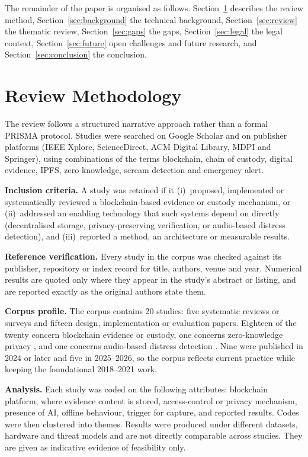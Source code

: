 \documentclass[conference,a4paper,10pt]{IEEEtran}
\begin{document}
The remainder of the paper is organised as follows. Section~\ref{sec:method} describes the review method, Section~\ref{sec:background} the technical background, Section~\ref{sec:review} the thematic review, Section~\ref{sec:gaps} the gaps, Section~\ref{sec:legal} the legal context, Section~\ref{sec:future} open challenges and future research, and Section~\ref{sec:conclusion} the conclusion.

\section{Review Methodology}\label{sec:method}
The review follows a structured narrative approach rather than a formal PRISMA protocol. Studies were searched on Google Scholar and on publisher platforms (IEEE Xplore, ScienceDirect, ACM Digital Library, MDPI and Springer), using combinations of the terms blockchain, chain of custody, digital evidence, IPFS, zero-knowledge, scream detection and emergency alert.

\textbf{Inclusion criteria.} A study was retained if it (i)~proposed, implemented or systematically reviewed a blockchain-based evidence or custody mechanism, or (ii)~addressed an enabling technology that such systems depend on directly (decentralised storage, privacy-preserving verification, or audio-based distress detection), and (iii)~reported a method, an architecture or measurable results.

\textbf{Reference verification.} Every study in the corpus was checked against its publisher, repository or index record for title, authors, venue and year. Numerical results are quoted only where they appear in the study's abstract or listing, and are reported exactly as the original authors state them.

\textbf{Corpus profile.} The corpus contains 20 studies: five systematic reviews or surveys \cite{akinbi,batista,onyeashie,lavin,bhad} and fifteen design, implementation or evaluation papers. Eighteen of the twenty concern blockchain evidence or custody, one concerns zero-knowledge privacy \cite{lavin}, and one concerns audio-based distress detection \cite{bhad}. Nine were published in 2024 or later and five in 2025--2026, so the corpus reflects current practice while keeping the foundational 2018--2021 work.

\textbf{Analysis.} Each study was coded on the following attributes: blockchain platform, where evidence content is stored, access-control or privacy mechanism, presence of AI, offline behaviour, trigger for capture, and reported results. Codes were then clustered into themes. Results were produced under different datasets, hardware and threat models and are not directly comparable across studies. They are given as indicative evidence of feasibility only.
\end{document}
